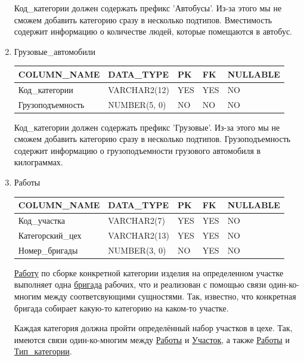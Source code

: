 \begin{enumerate}
    Код\_категории должен содержать префикс 'Автобусы'. Из-за этого мы не сможем добавить категорию сразу в несколько подтипов.
    Вместимость содержит информацию о количестве людей, которые помещаются в автобус.

    \item{Грузовые\_автомобили}

    \begin{tabular}{|p{7cm}|p{3cm}|p{1cm}|p{1cm}|p{3cm}|} \hline

        {\bf COLUMN\_NAME} & {\bf DATA\_TYPE} & {\bf PK} & {\bf FK} & {\bf NULLABLE} \\ \hline
        Код\_категории & VARCHAR2(12) & YES & YES & NO \\ \hline
        Грузоподъемность & NUMBER(5, 0) & NO & NO & NO \\ \hline

    \end{tabular}

    Код\_категории должен содержать префикс 'Грузовые'. Из-за этого мы не сможем добавить категорию сразу в несколько подтипов.
    Грузоподъемность содержит информацию о грузоподъемности грузового автомобиля в килограммах.

    \item{Работы}

    \begin{tabular}{|p{7cm}|p{3cm}|p{1cm}|p{1cm}|p{3cm}|} \hline

        {\bf COLUMN\_NAME} & {\bf DATA\_TYPE} & {\bf PK} & {\bf FK} & {\bf NULLABLE} \\ \hline
        Код\_участка & VARCHAR2(7) & YES & YES & NO \\ \hline
        Категорский\_цех & VARCHAR2(13) & YES & YES & NO \\ \hline
        Номер\_бригады & NUMBER(3, 0) & NO & YES & NO \\ \hline

    \end{tabular}

    \underline{Работу} по сборке конкретной категории изделия на определенном участке выполняет одна \underline{бригада} рабочих, что и реализован с помощью связи один-ко-многим между соответсвующими сущностями.
    Так, известно, что конкретная бригада собирает какую-то категорию на каком-то участке.

    Каждая категория должна пройти определённый набор участков в цехе.
    Так, имеются связи один-ко-многим между \underline{Работы} и \underline{Участок}, а также \underline{Работы} и \underline{Тип\_категории}.


\end{enumerate}
